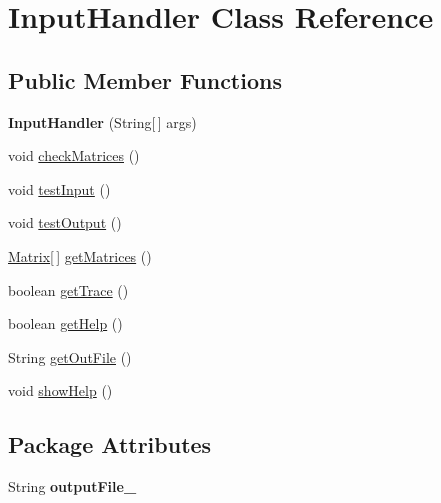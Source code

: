 \hypertarget{classInputHandler}{\section{\-Input\-Handler \-Class \-Reference}
\label{db/df6/classInputHandler}
}
\subsection*{\-Public \-Member \-Functions}
\begin{DoxyCompactItemize}
\item 
\hypertarget{classInputHandler_a9fa6c649650b395d7e503e320b09a3b8}{{\bfseries \-Input\-Handler} (\-String\mbox{[}$\,$\mbox{]} args)}\label{db/df6/classInputHandler_a9fa6c649650b395d7e503e320b09a3b8}

\item 
void \hyperlink{classInputHandler_a2ebf00705f7c5145f885a3e689a60051}{check\-Matrices} ()
\item 
void \hyperlink{classInputHandler_a522659c575226af081f4d5f403e8d9b7}{test\-Input} ()
\item 
void \hyperlink{classInputHandler_a898cc58248862076ad8dcdf9d6a2318b}{test\-Output} ()
\item 
\hyperlink{classMatrix}{\-Matrix}\mbox{[}$\,$\mbox{]} \hyperlink{classInputHandler_abf53f17b5ebc36a4a24167b6b76cf046}{get\-Matrices} ()
\item 
boolean \hyperlink{classInputHandler_ae91026c105b48ae87859d8b4659f0bdd}{get\-Trace} ()
\item 
boolean \hyperlink{classInputHandler_ae08515ed26e4e9260cf4a21702bc3459}{get\-Help} ()
\item 
\-String \hyperlink{classInputHandler_a44c0174e8603ccbbce48981ed5d1a229}{get\-Out\-File} ()
\item 
void \hyperlink{classInputHandler_a8e2bc7e7ee5294f36b6801b5f204cc89}{show\-Help} ()
\end{DoxyCompactItemize}
\subsection*{\-Package \-Attributes}
\begin{DoxyCompactItemize}
\item 
\hypertarget{classInputHandler_a23ec22f105b8d70d265601e2592ef8c9}{\-String {\bfseries output\-File\-\_\-}}\label{db/df6/classInputHandler_a23ec22f105b8d70d265601e2592ef8c9}

\end{DoxyCompactItemize}


